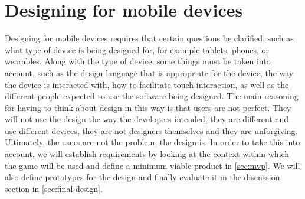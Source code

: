 \section{Designing for mobile devices}\label{sec:design-intro}
Designing for mobile devices requires that certain questions be clarified, such as what type of device is being designed for, for example tablets, phones, or wearables.
Along with the type of device, some things must be taken into account, such as the design language that is appropriate for the device, the way the device is interacted with,  how to facilitate touch interaction, as well as the different people expected to use the software being designed.
The main reasoning for having to think about design in this way is that users are not perfect.
They will not use the design the way the developers intended, they are different and use different devices, they are not designers themselves and they are unforgiving.
Ultimately, the users are not the problem, the design is.
In order to take this into account, we will establish requirements by looking at the context within which the game will be used and define a minimum viable product in \autoref{sec:mvp}.
We will also define prototypes for the design and finally evaluate it in the discussion section in \autoref{sec:final-design}.
